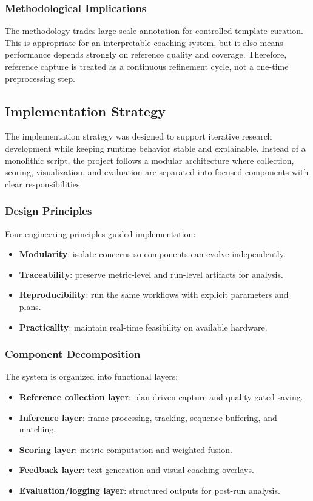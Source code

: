 \documentclass[12pt]{article}
\begin{document}
{\subsubsection{Methodological Implications}

The methodology trades large-scale annotation for controlled template curation. This is appropriate for an interpretable coaching system, but it also means performance depends strongly on reference quality and coverage. Therefore, reference capture is treated as a continuous refinement cycle, not a one-time preprocessing step.

\subsection{Implementation Strategy}

The implementation strategy was designed to support iterative research development while keeping runtime behavior stable and explainable. Instead of a monolithic script, the project follows a modular architecture where collection, scoring, visualization, and evaluation are separated into focused components with clear responsibilities.

\subsubsection{Design Principles}

Four engineering principles guided implementation:

\begin{itemize}
    \item \textbf{Modularity}: isolate concerns so components can evolve independently.
    \item \textbf{Traceability}: preserve metric-level and run-level artifacts for analysis.
    \item \textbf{Reproducibility}: run the same workflows with explicit parameters and plans.
    \item \textbf{Practicality}: maintain real-time feasibility on available hardware.
\end{itemize}

\subsubsection{Component Decomposition}

The system is organized into functional layers:

\begin{itemize}
    \item \textbf{Reference collection layer}: plan-driven capture and quality-gated saving.
    \item \textbf{Inference layer}: frame processing, tracking, sequence buffering, and matching.
    \item \textbf{Scoring layer}: metric computation and weighted fusion.
    \item \textbf{Feedback layer}: text generation and visual coaching overlays.
    \item \textbf{Evaluation/logging layer}: structured outputs for post-run analysis.
\end{itemize}

}
\end{document}
